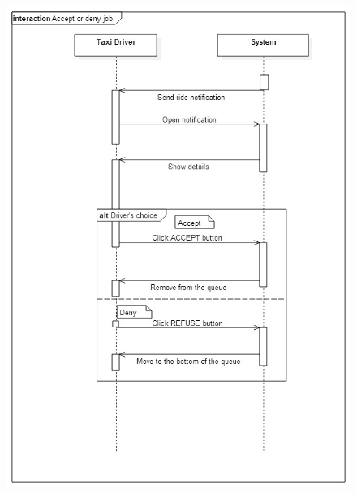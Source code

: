 \newpage
\begin{figure}[h!]
	\centering
	\includegraphics[height=0.95\textheight]{"myTaxiServiceImg/SequenceDiagram/Accept or deny job"}
\end{figure}
\newpage

